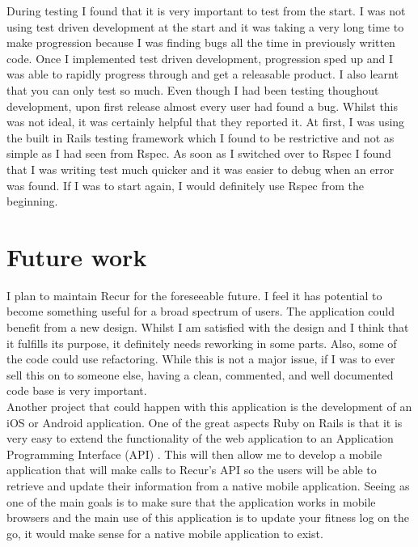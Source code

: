 During testing I found that it is very important to test from the start. I was not using test driven development at the start and it was taking a very long time to make progression because I was finding bugs all the time in previously written code. Once I implemented test driven development, progression sped up and I was able to rapidly progress through and get a releasable product. I also learnt that you can only test so much. Even though I had been testing thoughout development, upon first release almost every user had found a bug. Whilst this was not ideal, it was certainly helpful that they reported it. At first, I was using the built in Rails testing framework which I found to be restrictive and not as simple as I had seen from Rspec. As soon as I switched over to Rspec I found that I was writing test much quicker and it was easier to debug when an error was found. If I was to start again, I would definitely use Rspec from the beginning.

\section{Future work}
I plan to maintain Recur for the foreseeable future. I feel it has potential to become something useful for a broad spectrum of users. The application could benefit from a new design. Whilst I am satisfied with the design and I think that it fulfills its purpose, it definitely needs reworking in some parts. Also, some of the code could use refactoring. While this is not a major issue, if I was to ever sell this on to someone else, having a clean, commented, and well documented code base is very important. \\

Another project that could happen with this application is the development of an iOS or Android application. One of the great aspects Ruby on Rails is that it is very easy to extend the functionality of the web application to an Application Programming Interface (API) . This will then allow me to develop a mobile application that will make calls to Recur's API so the users will be able to retrieve and update their information from a native mobile application. Seeing as one of the main goals is to make sure that the application works in mobile browsers and the main use of this application is to update your fitness log on the go, it would make sense for a native mobile application to exist.